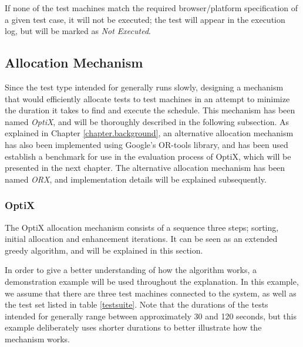 
If none of the test machines match the required browser/platform specification of a given test case, it will not be executed; the test will appear in the execution log, but will be marked as \emph{Not Executed}.




\subsection{Allocation Mechanism}\label{allocation}

Since the test type intended for \toolname \space generally runs slowly, designing a mechanism that would efficiently allocate tests to test machines in an attempt to minimize the duration it takes to find and execute the schedule. This mechanism has been named \emph{OptiX}, and will be thoroughly described in the following subsection. As explained in Chapter \ref{chapter.background}, an alternative allocation mechanism has also been implemented using Google's OR-tools library, and has been used establish a benchmark for use in the evaluation process of OptiX, which will be presented in the next chapter. The alternative allocation mechanism has been named \emph{ORX}, and implementation details will be explained subsequently.

\subsubsection{OptiX}\label{subsection.orx}

The OptiX allocation mechanism consists of a sequence three steps; sorting, initial allocation and enhancement iterations. It can be seen as an extended greedy algorithm, and will be explained in this section.

In order to give a better understanding of how the algorithm works, a demonstration example will be used throughout the explanation. In this example, we assume that there are three test machines connected to the system, as well as the test set listed in table \ref{testsuite}. Note that the durations of the tests intended for \toolname \space generally range between approximately 30 and 120 seconds, but this example deliberately uses shorter durations to better illustrate how the mechanism works.

